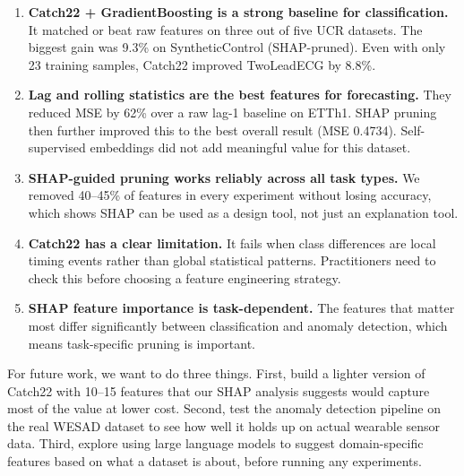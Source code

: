 \documentclass[10pt,conference]{IEEEtran}
\begin{document}
\begin{enumerate}
  \item \textbf{Catch22 + GradientBoosting is a strong baseline for classification.} It matched or beat raw features on three out of five UCR datasets. The biggest gain was 9.3\% on SyntheticControl (SHAP-pruned). Even with only 23 training samples, Catch22 improved TwoLeadECG by 8.8\%.
  \item \textbf{Lag and rolling statistics are the best features for forecasting.} They reduced MSE by 62\% over a raw lag-1 baseline on ETTh1. SHAP pruning then further improved this to the best overall result (MSE 0.4734). Self-supervised embeddings did not add meaningful value for this dataset.
  \item \textbf{SHAP-guided pruning works reliably across all task types.} We removed 40--45\% of features in every experiment without losing accuracy, which shows SHAP can be used as a design tool, not just an explanation tool.
  \item \textbf{Catch22 has a clear limitation.} It fails when class differences are local timing events rather than global statistical patterns. Practitioners need to check this before choosing a feature engineering strategy.
  \item \textbf{SHAP feature importance is task-dependent.} The features that matter most differ significantly between classification and anomaly detection, which means task-specific pruning is important.
\end{enumerate}

For future work, we want to do three things. First, build a lighter version of Catch22 with 10--15 features that our SHAP analysis suggests would capture most of the value at lower cost. Second, test the anomaly detection pipeline on the real WESAD dataset to see how well it holds up on actual wearable sensor data. Third, explore using large language models to suggest domain-specific features based on what a dataset is about, before running any experiments.
\end{document}
